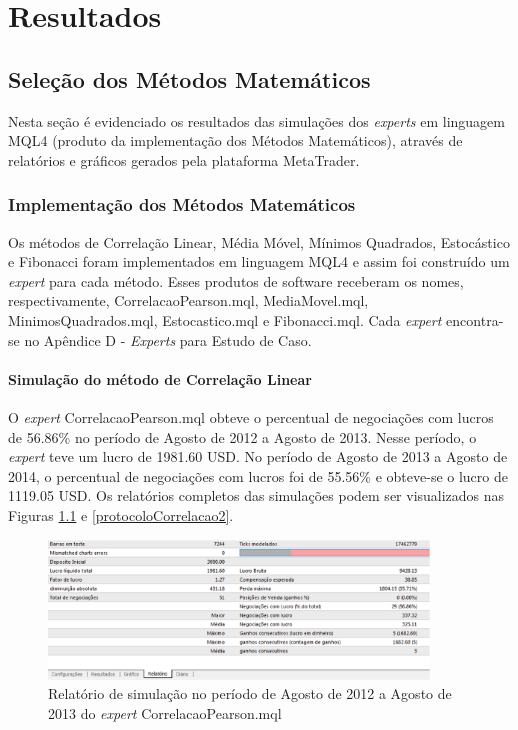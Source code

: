 \chapter{Resultados}


\section{Seleção dos Métodos Matemáticos}

Nesta seção é evidenciado os resultados  das simulações dos \textit{experts} em linguagem MQL4 (produto da implementação dos Métodos Matemáticos), através de relatórios e gráficos gerados pela plataforma MetaTrader.

\subsection{Implementação dos Métodos Matemáticos}

Os métodos de Correlação Linear, Média Móvel, Mínimos Quadrados, Estocástico e Fibonacci foram implementados em linguagem MQL4 e assim foi construído um \textit{expert} para cada método. Esses produtos de software receberam os nomes, respectivamente, CorrelacaoPearson.mql, MediaMovel.mql, MinimosQuadrados.mql, Estocastico.mql e Fibonacci.mql. Cada \textit{expert} encontra-se no Apêndice D - \textit{Experts} para Estudo de Caso.

\subsubsection{Simulação do método de Correlação Linear}

O \textit{expert} CorrelacaoPearson.mql obteve o percentual de negociações com lucros de 56.86\% no período de Agosto de 2012 a Agosto de 2013. Nesse período, o \textit{expert} teve um lucro de 1981.60 USD. No período de Agosto de 2013 a Agosto de 2014, o percentual de negociações com lucros foi de 55.56\%  e obteve-se o lucro de 1119.05 USD. 
Os relatórios completos das simulações podem ser visualizados nas Figuras \ref{protocoloCorrelacao} e \ref{protocoloCorrelacao2}.

\begin{figure}[H]
\centering
\includegraphics[width=0.9\textwidth]{figuras/protocoloCorrelacao}
\caption{Relatório de simulação no período de Agosto de 2012 a Agosto de 2013 do \textit{expert} CorrelacaoPearson.mql}
\label{protocoloCorrelacao}
\end{figure}

